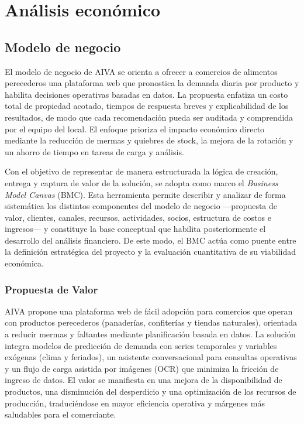 \chapter{Análisis económico}\label{chapter04}

\section{Modelo de negocio}

El modelo de negocio de AIVA se orienta a ofrecer a comercios de alimentos perecederos una plataforma web que pronostica la demanda diaria por producto y habilita decisiones operativas basadas en datos. La propuesta enfatiza un costo total de propiedad acotado, tiempos de respuesta breves y explicabilidad de los resultados, de modo que cada recomendación pueda ser auditada y comprendida por el equipo del local. El enfoque prioriza el impacto económico directo mediante la reducción de mermas y quiebres de stock, la mejora de la rotación y un ahorro de tiempo en tareas de carga y análisis.

Con el objetivo de representar de manera estructurada la lógica de creación, entrega y captura de valor de la solución, se adopta como marco el \textit{Business Model Canvas} (BMC). Esta herramienta permite describir y analizar de forma sistemática los distintos componentes del modelo de negocio —propuesta de valor, clientes, canales, recursos, actividades, socios, estructura de costos e ingresos— y constituye la base conceptual que habilita posteriormente el desarrollo del análisis financiero. De este modo, el BMC actúa como puente entre la definición estratégica del proyecto y la evaluación cuantitativa de su viabilidad económica.

\subsection{Propuesta de Valor}
AIVA propone una plataforma web de fácil adopción para comercios que operan con productos perecederos (panaderías, confiterías y tiendas naturales), orientada a reducir mermas y faltantes mediante planificación basada en datos. La solución integra modelos de predicción de demanda con series temporales y variables exógenas (clima y feriados), un asistente conversacional para consultas operativas y un flujo de carga asistida por imágenes (OCR) que minimiza la fricción de ingreso de datos. El valor se manifiesta en una mejora de la disponibilidad de productos, una disminución del desperdicio y una optimización de los recursos de producción, traduciéndose en mayor eficiencia operativa y márgenes más saludables para el comerciante.


